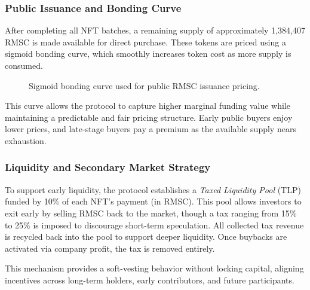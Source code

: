 \documentclass[conference]{IEEEtran}
\begin{document}
\subsubsection{Public Issuance and Bonding Curve}

After completing all NFT batches, a remaining supply of approximately 1,384,407 RMSC is made available for direct purchase. These tokens are priced using a sigmoid bonding curve, which smoothly increases token cost as more supply is consumed.
\begin{figure}[ht]
\centering
{}
\caption{Sigmoid bonding curve used for public RMSC issuance pricing.}
\label{fig:sigmoidcurve}
\end{figure}



This curve allows the protocol to capture higher marginal funding value while maintaining a predictable and fair pricing structure. Early public buyers enjoy lower prices, and late-stage buyers pay a premium as the available supply nears exhaustion.

\subsubsection{Liquidity and Secondary Market Strategy}

To support early liquidity, the protocol establishes a \textit{Taxed Liquidity Pool} (TLP) funded by 10\% of each NFT’s payment (in RMSC). This pool allows investors to exit early by selling RMSC back to the market, though a tax ranging from 15\% to 25\% is imposed to discourage short-term speculation. All collected tax revenue is recycled back into the pool to support deeper liquidity. Once buybacks are activated via company profit, the tax is removed entirely.

This mechanism provides a soft-vesting behavior without locking capital, aligning incentives across long-term holders, early contributors, and future participants.
\end{document}
